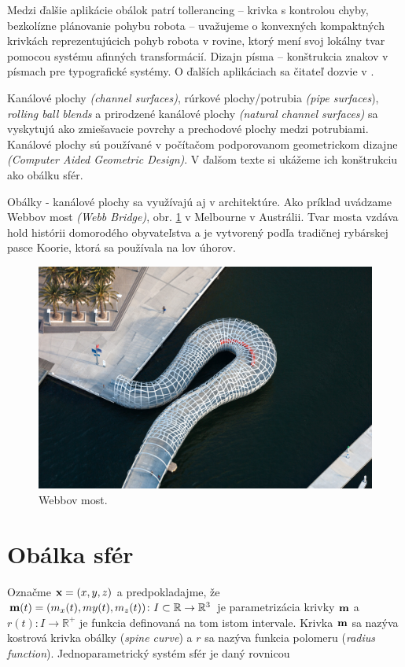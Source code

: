 Medzi ďalšie aplikácie obálok patrí tollerancing – krivka s kontrolou chyby, bezkolízne plánovanie pohybu robota – uvažujeme o konvexných kompaktných krivkách reprezentujúcich pohyb robota v rovine, ktorý mení svoj lokálny tvar pomocou systému afinných transformácií. Dizajn písma – konštrukcia znakov v písmach pre typografické systémy. O ďalších aplikáciach sa čitateľ dozvie v \cite{Pott09}.

Kanálové plochy \textit{(channel surfaces)}, rúrkové plochy/potrubia \textit{(pipe surfaces}), \textit{rolling ball blends} a prirodzené kanálové plochy \textit{(natural channel surfaces)} sa vyskytujú ako zmiešavacie povrchy a prechodové plochy medzi potrubiami. Kanálové plochy sú používané v počítačom podporovanom geometrickom dizajne \textit{(Computer Aided Geometric Design)}. V ďalšom texte si ukážeme ich konštrukciu ako obálku sfér.

Obálky - kanálové plochy sa využívajú aj v architektúre. Ako príklad uvádzame Webbov most \textit{(Webb Bridge)}, obr. \ref{fig:webb_bridge} v Melbourne v Austrálii. Tvar mosta vzdáva hold histórii domorodého obyvateľstva a je vytvorený podľa tradičnej rybárskej pasce Koorie, ktorá sa používala na lov úhorov.

\begin{figure}[h!]
	\centering
	\includegraphics[width=\textwidth]{images/webbbridge.jpg}
	\caption{Webbov most. \cite{WebbBridge}}
	\label{fig:webb_bridge}
\end{figure}

\section{Obálka sfér}
Označme $\bold{x} = (x, y, z)$ a predpokladajme, že $\bold{m}(t) = (m_x(t), my(t), m_z(t)) \colon I \subset \mathbb{R} \rightarrow \mathbb{R}^3$ je parametrizácia krivky $\bold{m}$ a $r(t) \colon I \rightarrow \mathbb{R}^{+}$ je funkcia definovaná na tom istom intervale. Krivka $\bold{m}$ sa nazýva kostrová krivka obálky (\textit{spine curve}) a $r$ sa nazýva funkcia polomeru (\textit{radius function}). Jednoparametrický systém sfér je daný rovnicou

